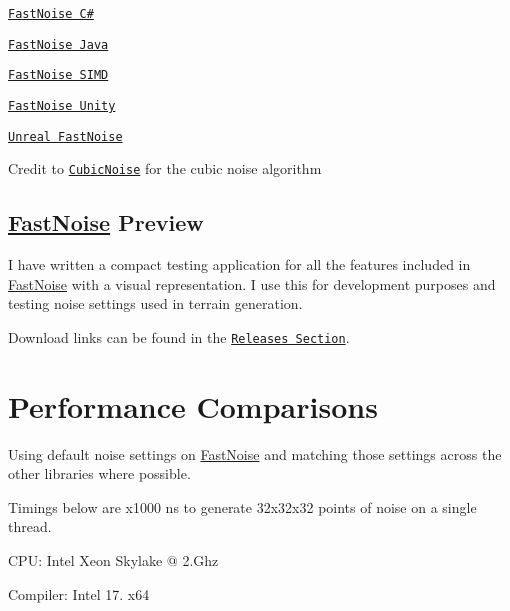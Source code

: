 \begin{DoxyItemize}
\item \href{https://github.com/Auburns/FastNoise_CSharp}{\tt Fast\+Noise C\#}
\item \href{https://github.com/Auburns/FastNoise_Java}{\tt Fast\+Noise Java}
\item \href{https://github.com/Auburns/FastNoiseSIMD}{\tt Fast\+Noise S\+I\+MD}
\item \href{https://www.assetstore.unity3d.com/en/#!/content/70706}{\tt Fast\+Noise Unity}
\item \href{https://github.com/midgen/UnrealFastNoise}{\tt Unreal Fast\+Noise}
\end{DoxyItemize}

Credit to \href{https://github.com/jobtalle/CubicNoise}{\tt Cubic\+Noise} for the cubic noise algorithm

\subsection*{\mbox{\hyperlink{class_fast_noise}{Fast\+Noise}} Preview}

I have written a compact testing application for all the features included in \mbox{\hyperlink{class_fast_noise}{Fast\+Noise}} with a visual representation. I use this for development purposes and testing noise settings used in terrain generation.

Download links can be found in the \href{https://github.com/Auburns/FastNoise/releases}{\tt Releases Section}.



\section*{Performance Comparisons}

Using default noise settings on \mbox{\hyperlink{class_fast_noise}{Fast\+Noise}} and matching those settings across the other libraries where possible.

Timings below are x1000 ns to generate 32x32x32 points of noise on a single thread.


\begin{DoxyItemize}
\item C\+PU\+: Intel Xeon Skylake @ 2.\+Ghz
\item Compiler\+: Intel 17. x64
\end{DoxyItemize}


